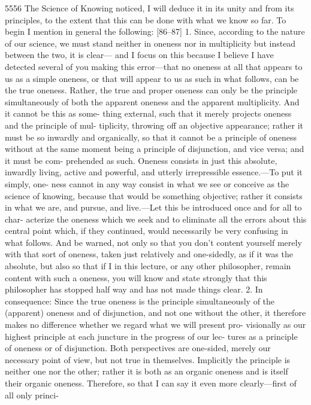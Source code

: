 5556
The Science of Knowing
noticed, I will deduce it in its unity and from its principles, to the extent that
this can be done with what we know so far.
To begin I mention in general the following:
[86–87] 1. Since, according to the nature of our science, we must stand
neither in oneness nor in multiplicity but instead between the two, it is clear—
and I focus on this because I believe I have detected several of you making this
error—that no oneness at all that appears to us as a simple oneness, or that
will appear to us as such in what follows, can be the true oneness. Rather, the
true and proper oneness can only be the principle simultaneously of both the
apparent oneness and the apparent multiplicity. And it cannot be this as some-
thing external, such that it merely projects oneness and the principle of mul-
tiplicity, throwing off an objective appearance; rather it must be so inwardly
and organically, so that it cannot be a principle of oneness without at the same
moment being a principle of disjunction, and vice versa; and it must be com-
prehended as such. Oneness consists in just this absolute, inwardly living,
active and powerful, and utterly irrepressible essence.—To put it simply, one-
ness cannot in any way consist in what we see or conceive as the science of
knowing, because that would be something objective; rather it consists in what
we are, and pursue, and live.—Let this be introduced once and for all to char-
acterize the oneness which we seek and to eliminate all the errors about this
central point which, if they continued, would necessarily be very confusing in
what follows. And be warned, not only so that you don’t content yourself
merely with that sort of oneness, taken just relatively and one-sidedly, as if it
was the absolute, but also so that if I in this lecture, or any other philosopher,
remain content with such a oneness, you will know and state strongly that this
philosopher has stopped half way and has not made things clear.
2. In consequence: Since the true oneness is the principle simultaneously
of the (apparent) oneness and of disjunction, and not one without the other,
it therefore makes no difference whether we regard what we will present pro-
visionally as our highest principle at each juncture in the progress of our lec-
tures as a principle of oneness or of disjunction. Both perspectives are one-sided,
merely our necessary point of view, but not true in themselves. Implicitly the
principle is neither one nor the other; rather it is both as an organic oneness and
is itself their organic oneness.
Therefore, so that I can say it even more clearly—first of all only princi-
